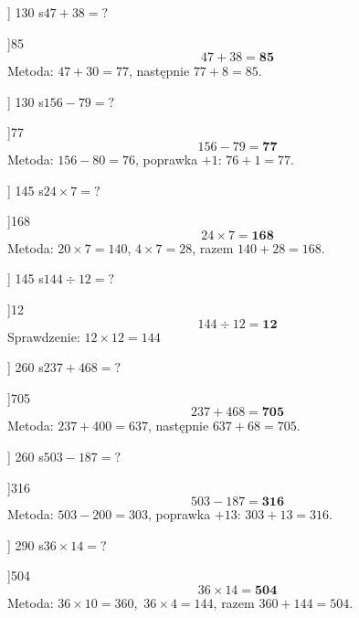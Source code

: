 
\ExerciseSlide[\CategoryBadge[ArithColor!20]{Dodawanie}]
  {1}{30 s}{$47 + 38 = ?$}

\AnswerSlide[\CategoryBadge[ArithColor!20]{Dodawanie}]{85}{
  {\footnotesize
    \[ 47 + 38 = \mathbf{85} \]
    Metoda: $47 + 30 = 77$, następnie $77 + 8 = 85$.
  }
}

\ExerciseSlide[\CategoryBadge[ArithColor!20]{Odejmowanie}]
  {1}{30 s}{$156 - 79 = ?$}

\AnswerSlide[\CategoryBadge[ArithColor!20]{Odejmowanie}]{77}{
  {\footnotesize
    \[ 156 - 79 = \mathbf{77} \]
    Metoda: $156 - 80 = 76$, poprawka $+1$: $76 + 1 = 77$.
  }
}

\ExerciseSlide[\CategoryBadge[ArithColor!20]{Mnożenie}]
  {1}{45 s}{$24 \times 7 = ?$}

\AnswerSlide[\CategoryBadge[ArithColor!20]{Mnożenie}]{168}{
  {\footnotesize
    \[ 24 \times 7 = \mathbf{168} \]
    Metoda: $20 \times 7 = 140$, $4 \times 7 = 28$,
    razem $140 + 28 = 168$.
  }
}

\ExerciseSlide[\CategoryBadge[ArithColor!20]{Dzielenie}]
  {1}{45 s}{$144 \div 12 = ?$}

\AnswerSlide[\CategoryBadge[ArithColor!20]{Dzielenie}]{12}{
  {\footnotesize
    \[ 144 \div 12 = \mathbf{12} \]
    Sprawdzenie: $12 \times 12 = 144$ \checkmark
  }
}

\ExerciseSlide[\CategoryBadge[ArithColor!20]{Dodawanie}]
  {2}{60 s}{$237 + 468 = ?$}

\AnswerSlide[\CategoryBadge[ArithColor!20]{Dodawanie}]{705}{
  {\footnotesize
    \[ 237 + 468 = \mathbf{705} \]
    Metoda: $237 + 400 = 637$, następnie $637 + 68 = 705$.
  }
}

\ExerciseSlide[\CategoryBadge[ArithColor!20]{Odejmowanie}]
  {2}{60 s}{$503 - 187 = ?$}

\AnswerSlide[\CategoryBadge[ArithColor!20]{Odejmowanie}]{316}{
  {\footnotesize
    \[ 503 - 187 = \mathbf{316} \]
    Metoda: $503 - 200 = 303$, poprawka $+13$: $303 + 13 = 316$.
  }
}

\ExerciseSlide[\CategoryBadge[ArithColor!20]{Mnożenie}]
  {2}{90 s}{$36 \times 14 = ?$}

\AnswerSlide[\CategoryBadge[ArithColor!20]{Mnożenie}]{504}{
  {\footnotesize
    \[ 36 \times 14 = \mathbf{504} \]
    Metoda: $36 \times 10 = 360$,\ $36 \times 4 = 144$,
    razem $360 + 144 = 504$.
  }
}

